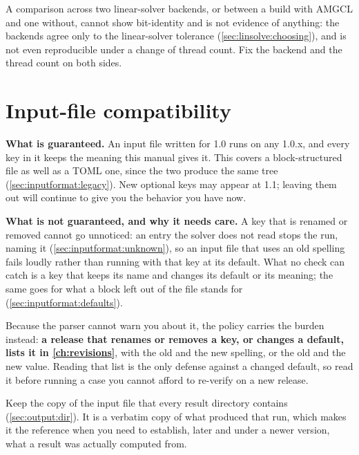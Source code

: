 \begin{warn}
  A comparison across two linear-solver backends, or between a build with AMGCL
  and one without, cannot show bit-identity and is not evidence of anything:
  the backends agree only to the linear-solver tolerance
  (\cref{sec:linsolve:choosing}), and  is not even reproducible
  under a change of thread count. Fix the backend and the thread count on both
  sides.
\end{warn}

\section{Input-file compatibility}
\label{sec:policy:compat}

\textbf{What is guaranteed.} An input file written for 1.0 runs on any 1.0.x,
and every key in it keeps the meaning this manual gives it. This covers a
block-structured  file as well as a TOML one, since the two produce the same
tree (\cref{sec:inputformat:legacy}). New optional keys may appear at 1.1; leaving them out
will continue to give you the behavior you have now.

\textbf{What is not guaranteed, and why it needs care.} A key that is renamed
or removed cannot go unnoticed: an entry the solver does not read stops the
run, naming it (\cref{sec:inputformat:unknown}), so an input file that uses an
old spelling fails loudly rather than running with that key at its default.
What no check can catch is a key that keeps its name and changes its default
or its meaning; the same goes for what a block left out of the file stands for
(\cref{sec:inputformat:defaults}).

\begin{warn}
  Because the parser cannot warn you about it, the policy carries the burden
  instead: \textbf{a release that renames or removes a key, or changes a
  default, lists it in \cref{ch:revisions}}, with the old and the new
  spelling, or the old and the new value. Reading that list is the only
  defense against a changed default, so read it before running a case you
  cannot afford to re-verify on a new release.
\end{warn}

Keep the copy of the input file that every result directory contains
(\cref{sec:output:dir}). It is a verbatim copy of what produced that run, which
makes it the reference when you need to establish, later and under a newer
version, what a result was actually computed from.

